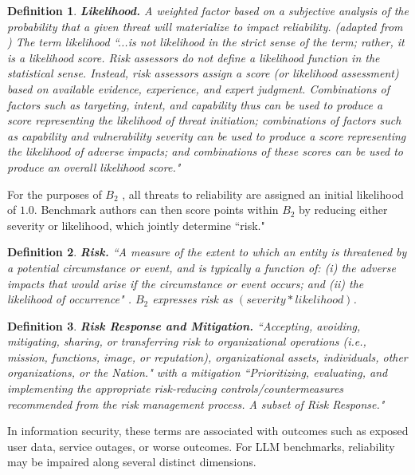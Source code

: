 \documentclass{article}
\newtheorem{dfn}{Definition}[section]
\newcommand\bb{$B_2$ }
\begin{document}
\begin{dfn}
{\bf Likelihood.} A weighted factor based on a subjective analysis of the probability that a given threat will materialize to impact reliability. (adapted from \cite{cnssi4009}) The term likelihood ``...is not likelihood in the strict sense of the term; rather, it is a likelihood score. Risk assessors do not define a likelihood function in the statistical sense. Instead, risk assessors assign a score (or likelihood assessment) based on available evidence, experience, and expert judgment. Combinations of factors such as targeting, intent, and capability thus can be used to produce a score representing the likelihood of threat initiation; combinations of factors such as capability and vulnerability severity can be used to produce a score representing the likelihood of adverse impacts; and combinations of these scores can be used to produce an overall likelihood score." \cite{nist80030r1}
\end{dfn}

For the purposes of \bb, all threats to reliability are assigned an initial likelihood of $1.0$. Benchmark authors can then score points within \bb by reducing either severity or likelihood, which jointly determine ``risk."

\begin{dfn}
{\bf Risk.} ``A measure of the extent to which an entity is threatened by a potential circumstance or event, and is typically a function of: (i) the adverse impacts that would arise if the circumstance or event occurs; and (ii) the likelihood of occurrence" \cite{nist80030r1}. \bb expresses risk as $(severity*likelihood)$.
\end{dfn}

\begin{dfn}
{\bf Risk Response and Mitigation.} ``Accepting, avoiding, mitigating, sharing, or transferring risk to organizational operations (i.e., mission, functions, image, or reputation), organizational assets, individuals, other organizations, or the Nation." \cite{joint2011sp} with a mitigation ``Prioritizing, evaluating, and implementing the appropriate risk-reducing controls/countermeasures recommended from the risk management process. A subset of Risk Response." \cite{cnssi4009}
\end{dfn}

In information security, these terms are associated with outcomes such as exposed user data, service outages, or worse outcomes. For LLM benchmarks, reliability may be impaired along several distinct dimensions.
\end{document}
